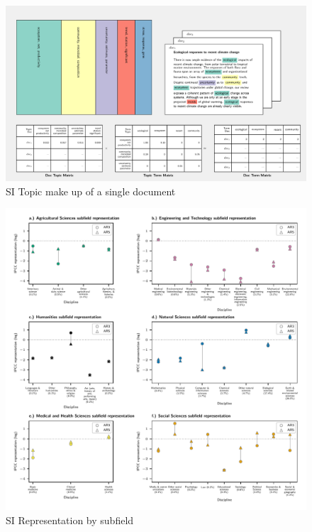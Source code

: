 \documentclass{article}
\begin{document}
\begin{linenumbers}
	
	
	\begin{figure}
		\begin{center}
			\includegraphics[width=1\linewidth]{plots/single_doc_3_536594_1861.pdf}
			\caption{SI Topic make up of a single document}
			\label{doc-topic}
		\end{center}
	\end{figure}

	\begin{figure}
	\begin{center}
		\includegraphics[width=1\linewidth]{plots_pub/ipcc_rep_wcs_simplified.pdf}
		\caption{SI Representation by subfield}
		\label{subfield}
	\end{center}
\end{figure}


\end{linenumbers}
\end{document}
